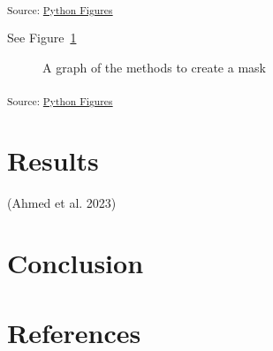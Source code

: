\documentclass[
sn-nature
]{sn-jnl}
\begin{document}
\textsubscript{Source:
\href{https://WeberLab.github.io/Chisep_CSVO2_Manuscript/notebooks/Figures.ipynb.html\#cell-fig-sample}{Python
Figures}}

See Figure~\ref{fig-graph}

\begin{figure}[H]


\caption{\label{fig-graph}A graph of the methods to create a mask}

\end{figure}%

\textsubscript{Source:
\href{https://WeberLab.github.io/Chisep_CSVO2_Manuscript/notebooks/Figures.ipynb.html\#cell-fig-graph}{Python
Figures}}

\section{Results}\label{sec-results}

(Ahmed et al. 2023)

\section{Conclusion}\label{sec-conclusion}

\section*{References}\label{references}
\end{document}
